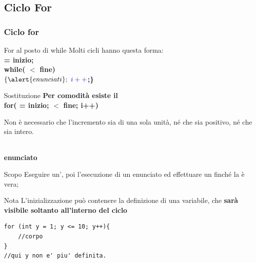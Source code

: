 \subsection*{Ciclo For}
\begin{frame}
\frametitle{Ciclo for}
\begin{block}{For al posto di while}
Molti cicli hanno questa forma:\\
\textbf{ = \alert{inizio;}}\\
\textbf{while( $<$ \alert{fine})}\\
\textbf{$\{ \alert{enunciati}; \mbox{ } \textCl{i++}$;\}}
\end{block}
\begin{block}{Sostituzione}
\textbf{Per comodità esiste il \textbf{}}\\
\hspace{0.7cm}\textbf{for( = \alert{inizio};  $<$ \alert{fine}; i++)}
\end{block}
\begin{block}{}
Non è necessario che l'incremento sia di una sola unità, né che sia positivo, né che sia intero.
\end{block}
\end{frame}

\begin{frame}[fragile]
\begin{block}{}
\textbf{}\\
\hspace{0.7cm} \textbf{\alert{enunciato}}
\end{block}
\begin{block}{Scopo}
Eseguire un'\textbf{}, poi \textbf{} l'esecuzione di un enunciato ed effettuare un 
\textbf{} finché la \textbf{} è vera;
\end{block}
\begin{block}{Nota}
L'inizializzazione può contenere la definizione di una variabile, che \textbf{\alert{sarà visibile soltanto all'interno del ciclo}}
\end{block}
\begin{lstlisting}
for (int y = 1; y <= 10; y++){
    //corpo
}
//qui y non e' piu' definita.
\end{lstlisting}
\end{frame}